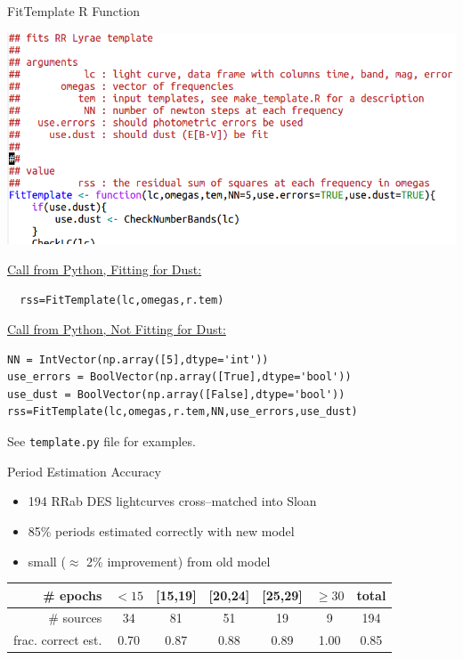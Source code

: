 \documentclass[12pt]{beamer}
\begin{document}
\begin{frame}[fragile]{FitTemplate R Function}

  \begin{center}
    \includegraphics[scale=0.2]{figs/FitTemplate.png}
  \end{center}

  \underline{Call from Python, Fitting for Dust:}


\begin{verbatim}
  rss=FitTemplate(lc,omegas,r.tem)
\end{verbatim}


  \underline{Call from Python, Not Fitting for Dust:}  \\
  
\begin{verbatim}
NN = IntVector(np.array([5],dtype='int'))
use_errors = BoolVector(np.array([True],dtype='bool'))
use_dust = BoolVector(np.array([False],dtype='bool'))
rss=FitTemplate(lc,omegas,r.tem,NN,use_errors,use_dust)
\end{verbatim}

  
\vspace{.1in}
  
See \texttt{template.py} file for examples.
  
\end{frame}


\begin{frame}{Period Estimation Accuracy}
  \begin{itemize}
  \item 194 RRab DES lightcurves cross--matched into Sloan
  \item 85\% periods estimated correctly with new model
  \item small ($\approx$ 2\% improvement) from old model
  \end{itemize}
    \begin{tabular}{ r | c | c | c | c | c | c }
\# epochs & $<15$ & [15,19] & [20,24] & [25,29] & $\geq 30$ & total\\ 
      \hline 
\# sources & 34 & 81 & 51 & 19 & 9 & 194\\ 
      frac. correct est. & 0.70 & 0.87 & 0.88 & 0.89 & 1.00 & 0.85
    \end{tabular}
    
\end{frame}
\end{document}
